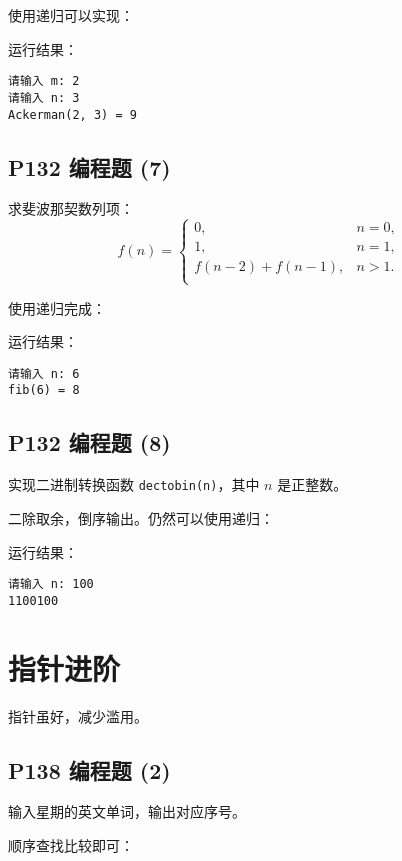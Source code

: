 \documentclass[cs4size,a4paper,nofonts]{ctexart}
\begin{document}
使用递归可以实现：


运行结果：
\begin{verbatim}
请输入 m: 2
请输入 n: 3
Ackerman(2, 3) = 9
\end{verbatim}

\subsection{P132 编程题 (7)}

求斐波那契数列项：
\[f(n) = \left\{\begin{array}{ll}
0, & n = 0, \\
1, & n = 1, \\
f(n - 2) + f(n - 1), & n > 1. \\
\end{array}\right.\]

使用递归完成：


运行结果：
\begin{verbatim}
请输入 n: 6
fib(6) = 8
\end{verbatim}

\subsection{P132 编程题 (8)}

实现二进制转换函数 {\tt dectobin(n)}，其中 $n$ 是正整数。

二除取余，倒序输出。仍然可以使用递归：


运行结果：
\begin{verbatim}
请输入 n: 100
1100100
\end{verbatim}

\section{指针进阶}

指针虽好，减少滥用。

\subsection{P138 编程题 (2)}

输入星期的英文单词，输出对应序号。

顺序查找比较即可：

\end{document}
